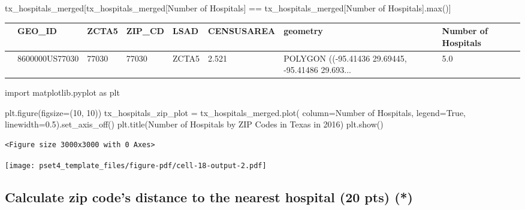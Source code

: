 \documentclass[
  letterpaper,
  DIV=11,
  numbers=noendperiod]{scrartcl}
\newenvironment{Shaded}{\begin{snugshade}}{\end{snugshade}}
\newcommand{\BuiltInTok}[1]{\textcolor[rgb]{0.00,0.23,0.31}{#1}}
\newcommand{\DecValTok}[1]{\textcolor[rgb]{0.68,0.00,0.00}{#1}}
\newcommand{\FloatTok}[1]{\textcolor[rgb]{0.68,0.00,0.00}{#1}}
\newcommand{\ImportTok}[1]{\textcolor[rgb]{0.00,0.46,0.62}{#1}}
\newcommand{\NormalTok}[1]{\textcolor[rgb]{0.00,0.23,0.31}{#1}}
\newcommand{\OperatorTok}[1]{\textcolor[rgb]{0.37,0.37,0.37}{#1}}
\newcommand{\StringTok}[1]{\textcolor[rgb]{0.13,0.47,0.30}{#1}}
\newcommand{\VariableTok}[1]{\textcolor[rgb]{0.07,0.07,0.07}{#1}}
\begin{document}
\begin{Shaded}
\begin{Highlighting}[]
\NormalTok{tx\_hospitals\_merged[tx\_hospitals\_merged[}\StringTok{\textquotesingle{}Number of Hospitals\textquotesingle{}}\NormalTok{]}
                    \OperatorTok{==}\NormalTok{ tx\_hospitals\_merged[}\StringTok{\textquotesingle{}Number of Hospitals\textquotesingle{}}\NormalTok{].}\BuiltInTok{max}\NormalTok{()]}
\end{Highlighting}
\end{Shaded}

\begin{longtable}[]{@{}llllllll@{}}
\toprule\noalign{}
& GEO\_ID & ZCTA5 & ZIP\_CD & LSAD & CENSUSAREA & geometry & Number of
Hospitals \\
\midrule\noalign{}
\endhead
\bottomrule\noalign{}
\endlastfoot
472 & 8600000US77030 & 77030 & 77030 & ZCTA5 & 2.521 & POLYGON
((-95.41436 29.69445, -95.41486 29.693... & 5.0 \\
\end{longtable}

\begin{Shaded}
\begin{Highlighting}[]
\ImportTok{import}\NormalTok{ matplotlib.pyplot }\ImportTok{as}\NormalTok{ plt}

\NormalTok{plt.figure(figsize}\OperatorTok{=}\NormalTok{(}\DecValTok{10}\NormalTok{, }\DecValTok{10}\NormalTok{))}
\NormalTok{tx\_hospitals\_zip\_plot }\OperatorTok{=}\NormalTok{ tx\_hospitals\_merged.plot(}
\NormalTok{    column}\OperatorTok{=}\StringTok{\textquotesingle{}Number of Hospitals\textquotesingle{}}\NormalTok{,}
\NormalTok{    legend}\OperatorTok{=}\VariableTok{True}\NormalTok{,}
\NormalTok{    linewidth}\OperatorTok{=}\FloatTok{0.5}\NormalTok{).set\_axis\_off()}
\NormalTok{plt.title(}\StringTok{\textquotesingle{}Number of Hospitals by ZIP Codes in Texas in 2016\textquotesingle{}}\NormalTok{)}
\NormalTok{plt.show()}
\end{Highlighting}
\end{Shaded}

\begin{verbatim}
<Figure size 3000x3000 with 0 Axes>
\end{verbatim}

\texttt{[image: pset4\_template\_files/figure-pdf/cell-18-output-2.pdf]}

\subsection{Calculate zip code's distance to the nearest hospital (20
pts)
(*)}\label{calculate-zip-codes-distance-to-the-nearest-hospital-20-pts}
\end{document}
